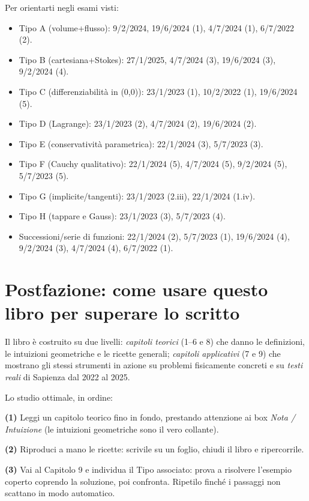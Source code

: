 \documentclass[11pt,a4paper,openany]{book}
\theoremstyle{plain}
\theoremstyle{definition}
\theoremstyle{remark}
\begin{document}
\begin{nota}[title={Mappa argomento $\to$ Tipo}]
Per orientarti negli esami visti:
\begin{itemize}
\item Tipo A (volume+flusso): 9/2/2024, 19/6/2024 (1), 4/7/2024 (1), 6/7/2022 (2).
\item Tipo B (cartesiana+Stokes): 27/1/2025, 4/7/2024 (3), 19/6/2024 (3), 9/2/2024 (4).
\item Tipo C (differenziabilit\`a in (0,0)): 23/1/2023 (1), 10/2/2022 (1), 19/6/2024 (5).
\item Tipo D (Lagrange): 23/1/2023 (2), 4/7/2024 (2), 19/6/2024 (2).
\item Tipo E (conservativit\`a parametrica): 22/1/2024 (3), 5/7/2023 (3).
\item Tipo F (Cauchy qualitativo): 22/1/2024 (5), 4/7/2024 (5), 9/2/2024 (5), 5/7/2023 (5).
\item Tipo G (implicite/tangenti): 23/1/2023 (2.iii), 22/1/2024 (1.iv).
\item Tipo H (tappare e Gauss): 23/1/2023 (3), 5/7/2023 (4).
\item Successioni/serie di funzioni: 22/1/2024 (2), 5/7/2023 (1), 19/6/2024 (4), 9/2/2024 (3), 4/7/2024 (4), 6/7/2022 (1).
\end{itemize}
\end{nota}

\chapter*{Postfazione: come usare questo libro per superare lo scritto}

Il libro \`e costruito su due livelli:
\emph{capitoli teorici} (1--6 e 8) che danno le definizioni, le
intuizioni geometriche e le ricette generali; \emph{capitoli applicativi}
(7 e 9) che mostrano gli stessi strumenti in azione su problemi
fisicamente concreti e su \emph{testi reali} di Sapienza dal 2022 al 2025.

Lo studio ottimale, in ordine:

\textbf{(1)} Leggi un capitolo teorico fino in fondo, prestando
attenzione ai box \emph{Nota / Intuizione} (le intuizioni geometriche
sono il vero collante).

\textbf{(2)} Riproduci a mano le ricette: scrivile su un foglio,
chiudi il libro e ripercorrile.

\textbf{(3)} Vai al Capitolo 9 e individua il Tipo associato:
prova a risolvere l'esempio coperto coprendo la soluzione,
poi confronta. Ripetilo finch\'e i passaggi non scattano in modo
automatico.
\end{document}
